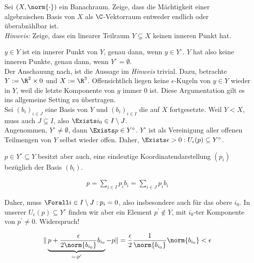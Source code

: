 \begin{exercise}

Sei $(X, \norm{\cdot})$ ein Banachraum.
Zeige, dass die Mächtigkeit einer algebraischen Basis von $X$ als $\C$-Vektorraum entweder endlich oder überabzählbar ist. \\

\textit{Hinweis:}
Zeige, dass ein linearer Teilraum $Y \subsetneq X$ keinen inneren Punkt hat.

\end{exercise}

\begin{solution}

$y \in Y$ ist ein innerer Punkt von $Y$, genau dann, wenn $y \in Y^\circ$.
$Y$ hat also keine inneren Punkte, genau dann, wenn $Y^\circ = \emptyset$. \\

Der Anschauung nach, ist die Aussage im \textit{Hinweis} trivial.
Dazu, betrachte $Y := \R^2 \times 0$ und $X := \R^3$.
Offensichtlich liegen keine $\epsilon$-Kugeln von $y \in Y$ wieder in $Y$, weil die letzte Komponente von $y$ immer $0$ ist.
Diese Argumentation gilt es ins allgemeine Setting zu übertragen. \\

Sei $(b_i)_{i \in J}$ eine Basis von $Y$ und $(b_i)_{i \in I}$ die auf $X$ fortgesetzte.
Weil $Y < X$, muss auch $J \subsetneq I$, also $\Exists i_0 \in I \setminus J$. \\

Angenommen, $Y^\circ \neq \emptyset$, dann $\Exists p \in Y^\circ$.
$Y^\circ$ ist als Vereinigung aller offenen Teilmengen von $Y$ selbst wieder offen.
Daher, $\Exists \epsilon > 0: U_\epsilon(p) \subseteq Y^\circ$.

$p \in Y^\circ \subseteq Y$ besitzt aber auch, eine eindeutige Koordinatendarstellung $(p_i)$ bezüglich der Basis $(b_i)$.

\begin{align*}
  p = \sum_{i \in I} p_i b_i
    = \sum_{i \in J} p_i b_i
\end{align*}

Daher, muss $\Forall i \in I \setminus J: p_i = 0$, also insbesondere auch für das obere $i_0$.
In unserer $U_\epsilon(p) \subseteq Y^\circ$ finden wir aber ein Element $p^\prime \notin Y$, mit $i_0$-ter Komponente von $p^\prime \neq 0$.
Widerspruch!

\begin{align*}
  \| \underbrace{p + \frac{\epsilon}{2 \norm{b_{i_0}}} b_{i_0}}_{=: p^\prime} - p \|
  =
  \frac{\epsilon}{2} \frac{1}{\norm{b_{i_0}}} \norm{b_{i_0}}
  <
  \epsilon
\end{align*}


\end{solution}
